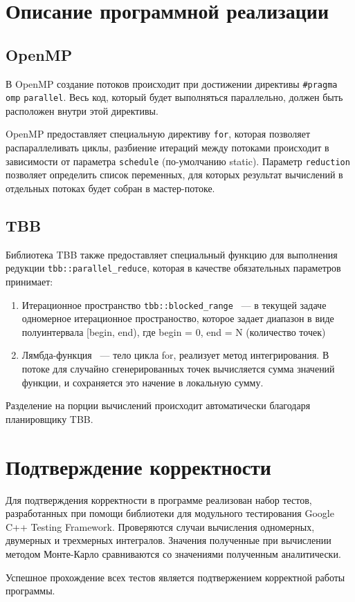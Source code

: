 \documentclass{report}
\begin{document}
\section*{Описание программной реализации}
\subsection*{OpenMP}
\par В OpenMP создание потоков происходит при достижении директивы \verb|#pragma omp| \verb|parallel|. Весь код, который будет выполняться параллельно, должен быть расположен внутри этой директивы.
\par OpenMP предоставляет специальную директиву \verb|for|, которая позволяет распараллеливать циклы, разбиение итераций между потоками происходит в зависимости от параметра \verb|schedule| (по-умолчанию static). Параметр \verb|reduction| позволяет определить список переменных, для которых результат вычислений в отдельных потоках будет собран в мастер-потоке.

\subsection*{TBB}
Библиотека TBB также предоставляет специальный функцию для выполнения редукции \verb|tbb::parallel_reduce|, которая в качестве обязательных параметров принимает:
 \begin{enumerate}
\item Итерационное пространство \verb|tbb::blocked_range|  ~--- в текущей задаче одномерное итерационное пространоство, которое задает диапазон в виде
полуинтервала [begin, end), где begin = 0, end = N (количество точек)
\item Лямбда-функция ~--- тело цикла for, реализует метод интегрирования. В потоке для случайно сгенерированных точек вычисляется сумма значений функции, и сохраняется это начение в локальную сумму.
\end{enumerate}
Разделение на порции вычислений происходит автоматически благодаря планировщику TBB.


\newpage

\section*{Подтверждение корректности}
Для подтверждения корректности в программе реализован набор тестов, разработанных при помощи библиотеки для модульного тестирования Google C++ Testing Framework. Проверяются случаи вычисления одномерных, двумерных и трехмерных интегралов. Значения полученные при вычислении методом Монте-Карло сравниваются со значениями полученным аналитически.
\par Успешное прохождение всех тестов является подтвержением корректной работы программы. 
\end{document}
